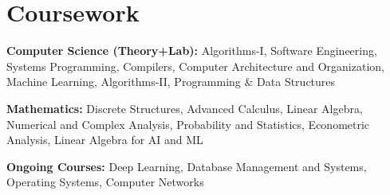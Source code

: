 \documentclass[a4paper,20pt]{article}
\newcommand{\resumeItem}[2]{
  \item\small{
    \textbf{#1}{#2 \vspace{-2pt}}
  }
}
\newcommand{\resumeSubItem}[2]{\resumeItem{#1}{#2}\vspace{-5pt}}
\newcommand{\resumeSubHeadingListStart}{\begin{itemize}[leftmargin=*]}
\newcommand{\resumeSubHeadingListEnd}{\end{itemize}}
\begin{document}
\section{Coursework}
\begin{description}[font=$\bullet$]
\item {\textbf{Computer Science (Theory+Lab):} Algorithms-I, Software Engineering, Systems Programming, Compilers, Computer Architecture and Organization, Machine Learning, Algorithms-II, Programming \& Data Structures}
\vspace{-3pt}
\item {\textbf{Mathematics:} Discrete Structures, Advanced Calculus, Linear Algebra, Numerical and Complex Analysis, Probability and Statistics, Econometric Analysis, Linear Algebra for AI and ML}
\vspace{-3pt}
\item {\textbf{Ongoing Courses:} Deep Learning, Database Management and Systems, Operating Systems, Computer Networks}

\end{description}


\end{document}

